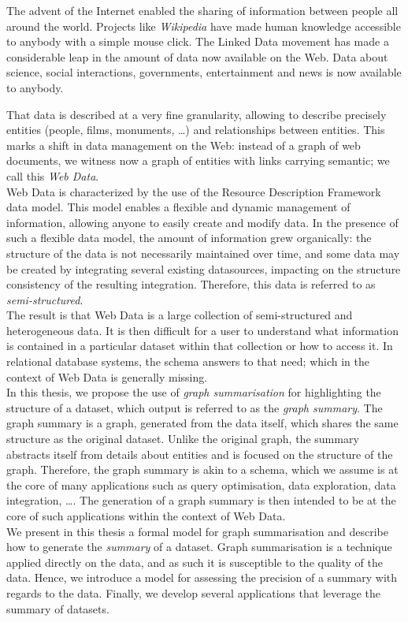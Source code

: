 The advent of the Internet enabled the sharing of information between people all around the world. Projects like \emph{Wikipedia} have made human knowledge accessible to anybody with a simple mouse click. The Linked Data movement has made a considerable leap in the amount of data now available on the Web. Data about science, social interactions, governments, entertainment and news is now available to anybody.

That data is described at a very fine granularity, allowing to describe precisely entities (people, films, monuments, \ldots) and relationships between entities. This marks a shift in data management on the Web: instead of a graph of web documents, we witness now a graph of entities with links carrying semantic; we call this \emph{Web Data}.\\

Web Data is characterized by the use of the Resource Description Framework data model. This model enables a flexible and dynamic management of information, allowing anyone to easily create and modify data. In the presence of such a flexible data model, the amount of information grew organically: the structure of the data is not necessarily maintained over time, and some data may be created by integrating several existing datasources, impacting on the structure consistency of the resulting integration. Therefore, this data is referred to as \emph{semi-structured}.\\

The result is that Web Data is a large collection of semi-structured and heterogeneous data. It is then difficult for a user to understand what information is contained in a particular dataset within that collection or how to access it. In relational database systems, the schema answers to that need; which in the context of Web Data is generally missing.\\

In this thesis, we propose the use of \emph{graph summarisation} for highlighting the structure of a dataset, which output is referred to as the \emph{graph summary}. The graph summary is a graph, generated from the data itself, which shares the same structure as the original dataset. Unlike the original graph, the summary abstracts itself from details about entities and is focused on the structure of the graph. Therefore, the graph summary is akin to a schema, which we assume is at the core of many applications such as query optimisation, data exploration, data integration, \ldots. The generation of a graph summary is then intended to be at the core of such applications within the context of Web Data.\\

We present in this thesis a formal model for graph summarisation and describe how to generate the \emph{summary} of a dataset. Graph summarisation is a technique applied directly on the data, and as such it is susceptible to the quality of the data. Hence, we introduce a model for assessing the precision of a summary with regards to the data. Finally, we develop several applications that leverage the summary of datasets.
